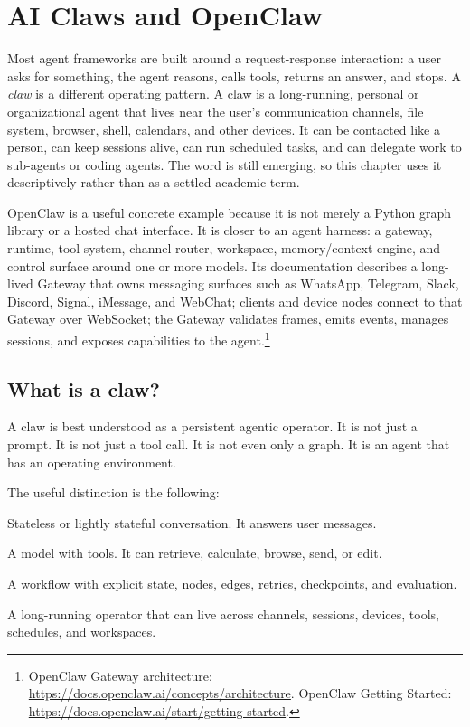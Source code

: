\chapter{AI Claws and OpenClaw}

Most agent frameworks are built around a request-response interaction: a user asks for something, the agent reasons, calls tools, returns an answer, and stops. A \emph{claw} is a different operating pattern. A claw is a long-running, personal or organizational agent that lives near the user's communication channels, file system, browser, shell, calendars, and other devices. It can be contacted like a person, can keep sessions alive, can run scheduled tasks, and can delegate work to sub-agents or coding agents. The word is still emerging, so this chapter uses it descriptively rather than as a settled academic term.

OpenClaw is a useful concrete example because it is not merely a Python graph library or a hosted chat interface. It is closer to an agent harness: a gateway, runtime, tool system, channel router, workspace, memory/context engine, and control surface around one or more models. Its documentation describes a long-lived Gateway that owns messaging surfaces such as WhatsApp, Telegram, Slack, Discord, Signal, iMessage, and WebChat; clients and device nodes connect to that Gateway over WebSocket; the Gateway validates frames, emits events, manages sessions, and exposes capabilities to the agent.\footnote{OpenClaw Gateway architecture: \url{https://docs.openclaw.ai/concepts/architecture}. OpenClaw Getting Started: \url{https://docs.openclaw.ai/start/getting-started}.}

\section{What is a claw?}

A claw is best understood as a persistent agentic operator. It is not just a prompt. It is not just a tool call. It is not even only a graph. It is an agent that has an operating environment.

The useful distinction is the following:

\begin{description}[leftmargin=*]
  \item[Chatbot.] Stateless or lightly stateful conversation. It answers user messages.
  \item[Tool-using agent.] A model with tools. It can retrieve, calculate, browse, send, or edit.
  \item[Graph agent.] A workflow with explicit state, nodes, edges, retries, checkpoints, and evaluation.
  \item[Claw.] A long-running operator that can live across channels, sessions, devices, tools, schedules, and workspaces.
\end{description}

